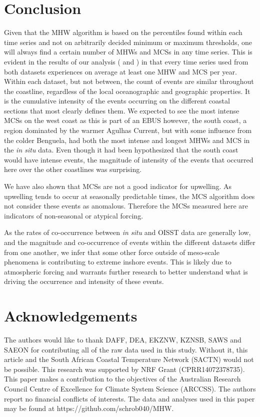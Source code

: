 \documentclass[a4paper,10pt,review]{elsarticle}
\begin{document}
\section{Conclusion}
Given that the MHW algorithm is based on the percentiles found within each time series and not on arbitrarily decided minimum or maximum thresholds, one will always find a certain number of MHWs and MCSs in any time series. This is evident in the results of our analysis ( and ) in that every time series used from both datasets experiences on average at least one MHW and MCS per year. Within each dataset, but not between, the count of events are similar throughout the coastline, regardless of the local oceanographic and geographic properties. It is the cumulative intensity of the events occurring on the different coastal sections that most clearly defines them. We expected to see the most intense MCSs on the west coast as this is part of an EBUS however, the south coast, a region dominated by the warmer Agulhas Current, but with some influence from the colder Benguela, had both the most intense and longest MHWs and MCS in the \emph{in situ} data. Even though it had been hypothesized that the south coast would have intense events, the magnitude of intensity of the events that occurred here over the other coastlines was surprising.

We have also shown that MCSs are not a good indicator for upwelling. As upwelling tends to occur at seasonally predictable times, the MCS algorithm does not consider these events as anomalous. Therefore the MCSs measured here are indicators of non-seasonal or atypical forcing.

As the rates of co-occurrence between \emph{in situ} and OISST data are generally low, and the magnitude and co-occurrence of events within the different datasets differ from one another, we infer that some other force outside of meso-scale phenomena is contributing to extreme inshore events. This is likely due to atmospheric forcing and warrants further research to better understand what is driving the occurrence and intensity of these events.

\section*{Acknowledgements}
The authors would like to thank DAFF, DEA, EKZNW, KZNSB, SAWS and SAEON for contributing all of the raw data used in this study. Without it, this article and the South African Coastal Temperature Network (SACTN) would not be possible. This research was supported by NRF Grant (CPRR14072378735). This paper makes a contribution to the objectives of the Australian Research Council Centre of Excellence for Climate System Science (ARCCSS). The authors report no financial conflicts of interests. The data and analyses used in this paper may be found at https://github.com/schrob040/MHW.
\end{document}
